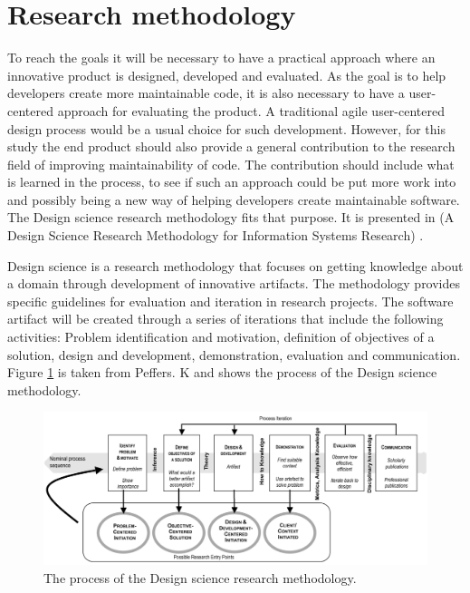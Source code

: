 \documentclass[pdftex,10pt,b5paper,twoside]{report}
\begin{document}
\section{Research methodology}
To reach the goals it will be necessary to have a practical approach where an innovative product is designed, developed and evaluated. As the goal is to help developers create more maintainable code, it is also necessary to have a user-centered approach for evaluating the product. A traditional agile user-centered design process would be a usual choice for such development. However, for this study the end product should also provide a general contribution to the research field of improving maintainability of code. The contribution should include what is learned in the process, to see if such an approach could be put more work into and possibly being a new way of helping developers create maintainable software. The Design science research methodology fits that purpose. It is presented in (A Design Science Research Methodology for Information Systems Research) \cite{Peffers2007ADS}.

Design science is a research methodology that focuses on getting knowledge about a domain through development of innovative artifacts. The methodology provides specific guidelines for evaluation and iteration in research projects. The software artifact will be created through a series of iterations that include the following activities: Problem identification and motivation, definition of objectives of a solution, design and development, demonstration, evaluation and communication. Figure \ref{fig:designScience} is taken from Peffers. K \cite{Peffers2007ADS} and shows the process of the Design science methodology. 

\begin{figure}[h!]
    \centering
    \includegraphics[width=\textwidth]{report/images/designScience.png}
    \caption{The process of the Design science research methodology.}
    \label{fig:designScience}
\end{figure}
\end{document}
